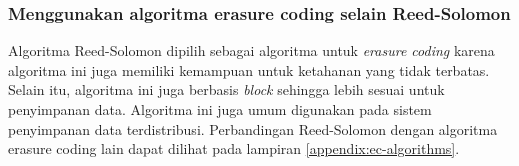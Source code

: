 \subsubsection{Menggunakan algoritma erasure coding selain Reed-Solomon}
Algoritma Reed-Solomon dipilih sebagai algoritma untuk \textit{erasure coding} karena algoritma ini juga memiliki kemampuan untuk ketahanan yang tidak terbatas. Selain itu, algoritma ini juga berbasis \textit{block} sehingga lebih sesuai untuk penyimpanan data. Algoritma ini juga umum digunakan pada sistem penyimpanan data terdistribusi. Perbandingan Reed-Solomon dengan algoritma erasure coding lain dapat dilihat pada lampiran \ref{appendix:ec-algorithms}.



